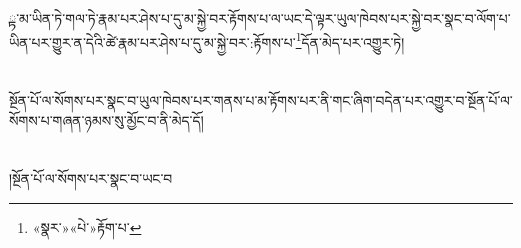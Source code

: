 ྟ་མ་ཡིན་ཏེ་གལ་ཏེ་རྣམ་པར་ཤེས་པ་དུ་མ་སྐྱེ་བར་རྟོགས་པ་ལ་ཡང་དེ་ལྟར་ཡུལ་ཁེབས་པར་སྐྱེ་བར་སྣང་བ་ལོག་པ་ཡིན་པར་གྱུར་ན་དེའི་ཚེ་རྣམ་པར་ཤེས་པ་དུ་མ་སྐྱེ་བར་:རྟོགས་པ་\footnote{«སྣར་»«པེ་»རྟོག་པ་}དོན་མེད་པར་འགྱུར་ཏེ།\chapter{ }སྔོན་པོ་ལ་སོགས་པར་སྣང་བ་ཡུལ་ཁེབས་པར་གནས་པ་མ་རྟོགས་པར་ནི་གང་ཞིག་བདེན་པར་འགྱུར་བ་སྔོན་པོ་ལ་སོགས་པ་གཞན་ཉམས་སུ་མྱོང་བ་ནི་མེད་དོ།\chapter{ }།སྔོན་པོ་ལ་སོགས་པར་སྣང་བ་ཡང་བ